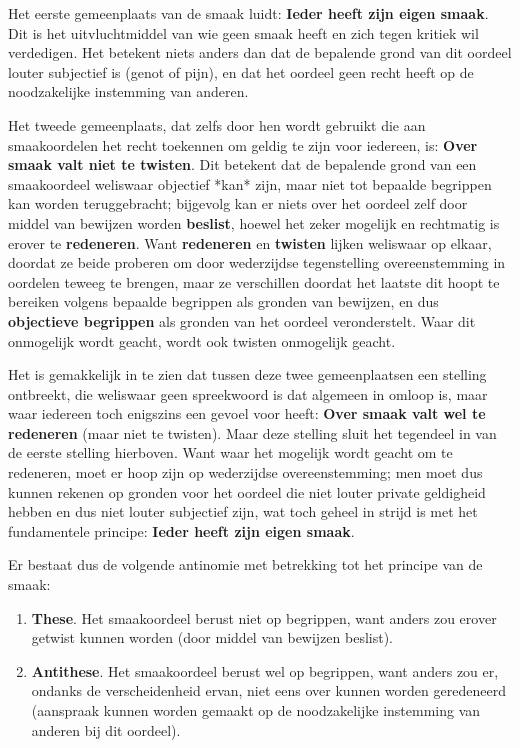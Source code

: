 Het eerste gemeenplaats van de smaak luidt: \textbf{Ieder heeft zijn eigen smaak}. Dit is het uitvluchtmiddel van wie geen smaak heeft en zich tegen kritiek wil verdedigen. Het betekent niets anders dan dat de bepalende grond van dit oordeel louter subjectief is (genot of pijn), en dat het oordeel geen recht heeft op de noodzakelijke instemming van anderen.

Het tweede gemeenplaats, dat zelfs door hen wordt gebruikt die aan smaakoordelen het recht toekennen om geldig te zijn voor iedereen, is: \textbf{Over smaak valt niet te twisten}. Dit betekent dat de bepalende grond van een smaakoordeel weliswaar objectief *kan* zijn, maar niet tot bepaalde begrippen kan worden teruggebracht; bijgevolg kan er niets over het oordeel zelf door middel van bewijzen worden \textbf{beslist}, hoewel het zeker mogelijk en rechtmatig is erover te \textbf{redeneren}. Want \textbf{redeneren} en \textbf{twisten} lijken weliswaar op elkaar, doordat ze beide proberen om door wederzijdse tegenstelling overeenstemming in oordelen teweeg te brengen, maar ze verschillen doordat het laatste dit hoopt te bereiken volgens bepaalde begrippen als gronden van bewijzen, en dus \textbf{objectieve begrippen} als gronden van het oordeel veronderstelt. Waar dit onmogelijk wordt geacht, wordt ook twisten onmogelijk geacht.

Het is gemakkelijk in te zien dat tussen deze twee gemeenplaatsen een stelling ontbreekt, die weliswaar geen spreekwoord is dat algemeen in omloop is, maar waar iedereen toch enigszins een gevoel voor heeft: \textbf{Over smaak valt wel te redeneren} (maar niet te twisten). Maar deze stelling sluit het tegendeel in van de eerste stelling hierboven. Want waar het mogelijk wordt geacht om te redeneren, moet er hoop zijn op wederzijdse overeenstemming; men moet dus kunnen rekenen op gronden voor het oordeel die niet louter private geldigheid hebben en dus niet louter subjectief zijn, wat toch geheel in strijd is met het fundamentele principe: \textbf{Ieder heeft zijn eigen smaak}.

Er bestaat dus de volgende antinomie met betrekking tot het principe van de smaak:

\begin{enumerate}
\item \textbf{These}. Het smaakoordeel berust niet op begrippen, want anders zou erover getwist kunnen worden (door middel van bewijzen beslist).
\item \textbf{Antithese}. Het smaakoordeel berust wel op begrippen, want anders zou er, ondanks de verscheidenheid ervan, niet eens over kunnen worden geredeneerd (aanspraak kunnen worden gemaakt op de noodzakelijke instemming van anderen bij dit oordeel).
\end{enumerate}

